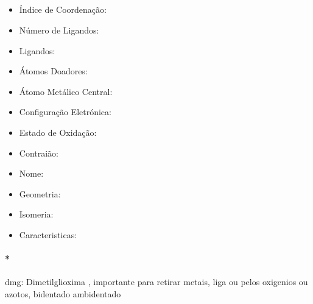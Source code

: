 \documentclass[12pt]{article}
\begin{document}
\noindent\begin{minipage}{\textwidth}
	
	\subsection{}
	\begin{itemize}
   
   \item Índice de Coordenação:
   
   \item Número de Ligandos:
   
   \item Ligandos:
   
   \item Átomos Doadores:
   
   \item Átomo Metálico Central:
   
   \item Configuração Eletrónica:
   
   \item Estado de Oxidação:
   
   \item Contraião:
   
   \item Nome:
   
   \item Geometria:
   
   \item Isomeria:

	\item Caracteristicas:

	\end{itemize}
	
\end{minipage}

\paragraph{*}
dmg: Dimetilglioxima , importante para retirar metais, liga ou pelos oxigenios ou azotos, bidentado ambidentado
\end{document}
